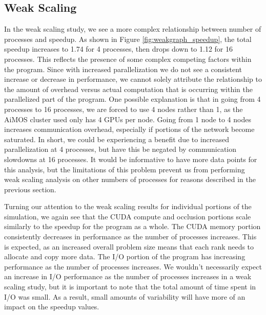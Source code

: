 \documentclass[conference]{IEEEtran}
\begin{document}
\subsection{Weak Scaling}
In the weak scaling study, we see a more complex relationship between number of processes and speedup. As shown in Figure \ref{fig:weakgraph_speedup}, the total speedup increases to 1.74 for 4 processes, then drops down to 1.12 for 16 processes. This reflects the presence of some complex competing factors within the program. Since with increased parallelization we do not see a consistent increase or decrease in performance, we cannot solely attribute the relationship to the amount of overhead versus actual computation that is occurring within the parallelized part of the program. One possible explanation is that in going from 4 processes to 16 processes, we are forced to use 4 nodes rather than 1, as the AiMOS cluster used only has 4 GPUs per node. Going from 1 node to 4 nodes increases communication overhead, especially if portions of the network become saturated. In short, we could be experiencing a benefit due to increased parallelization at 4 processes, but have this be negated by communication slowdowns at 16 processes. It would be informative to have more data points for this analysis, but the limitations of this problem prevent us from performing weak scaling analysis on other numbers of processes for reasons described in the previous section.

Turning our attention to the weak scaling results for individual portions of the simulation, we again see that the CUDA compute and occlusion portions scale similarly to the speedup for the program as a whole. The CUDA memory portion consistently decreases in performance as the number of processes increases. This is expected, as an increased overall problem size means that each rank needs to allocate and copy more data. The I/O portion of the program has increasing performance as the number of processes increases. We wouldn't necessarily expect an increase in I/O performance as the number of processes increases in a weak scaling study, but it is important to note that the total amount of time spent in I/O was small. As a result, small amounts of variability will have more of an impact on the speedup values. 
\end{document}
